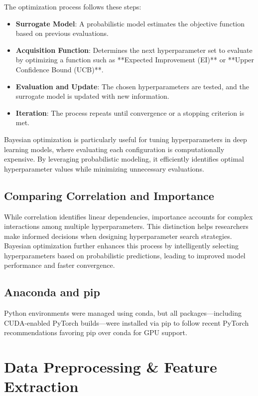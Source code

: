 The optimization process follows these steps:
\begin{itemize}
    \item \textbf{Surrogate Model}: A probabilistic model estimates the objective function based on previous evaluations.
    \item \textbf{Acquisition Function}: Determines the next hyperparameter set to evaluate by optimizing a function such as **Expected Improvement (EI)** or **Upper Confidence Bound (UCB)**.
    \item \textbf{Evaluation and Update}: The chosen hyperparameters are tested, and the surrogate model is updated with new information.
    \item \textbf{Iteration}: The process repeats until convergence or a stopping criterion is met.
\end{itemize}

Bayesian optimization is particularly useful for tuning hyperparameters in deep learning models, where evaluating each configuration is computationally expensive. By leveraging probabilistic modeling, it efficiently identifies optimal hyperparameter values while minimizing unnecessary evaluations.

\subsection{Comparing Correlation and Importance}

While correlation identifies linear dependencies, importance accounts for complex interactions among multiple hyperparameters. This distinction helps researchers make informed decisions when designing hyperparameter search strategies. Bayesian optimization further enhances this process by intelligently selecting hyperparameters based on probabilistic predictions, leading to improved model performance and faster convergence.

\subsection{Anaconda and pip}
\label{ssec:conda_pip}
Python environments were managed using conda, but all packages—including CUDA-enabled PyTorch builds—were installed via pip to follow recent PyTorch recommendations favoring pip over conda for GPU support.

\section{Data Preprocessing \& Feature Extraction}
\label{sec:preprocessing}

